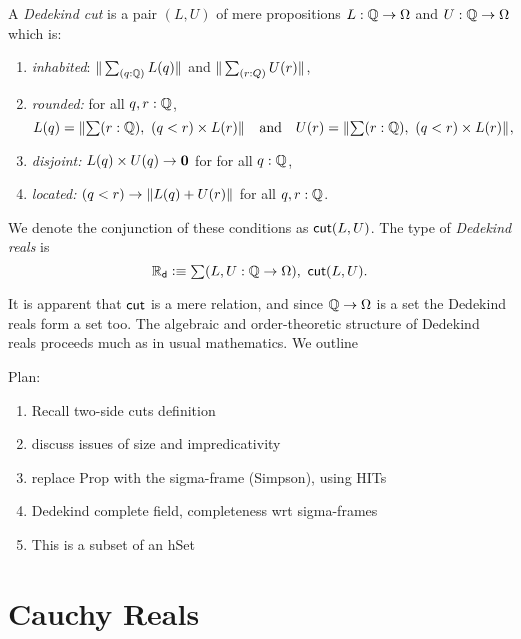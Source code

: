 \begin{defn}
  A \emph{Dedekind cut} is a pair $(L, U)$ of mere propositions $L : \mathbb{Q} \to \Omega$ and $U
  : \mathbb{Q} \to \Omega$ which is:
  \begin{enumerate}
  \item \emph{inhabited}: $\brck{\sm{q : \Q} L(q)}$ and $\brck{\sm{r : Q} U(r)}$,
  \item \emph{rounded:} for all $q, r : \mathbb{Q}$,
    \begin{equation*}
      L(q) = {\brck{\sm{r : \Q} (q < r) \times L(r)}}
      \quad\text{and}\quad
      U(r) = \brck{\sm{r : \Q} (q < r) \times L(r)},
    \end{equation*}
  \item \emph{disjoint:} $L(q) \times U(q) \to \mathbf{0}$ for for all $q : \mathbb{Q}$,
  \item \emph{located:} $(q < r) \to \Vert L(q) + U(r)\Vert_{}$ for all $q, r : \mathbb{Q}$.
  \end{enumerate}
  We denote the conjunction of these conditions as $\mathsf{cut}(L, U)$. The type of \emph{Dedekind
    reals} is
  \begin{equation*}
    \RD \defeq \sm{L, U : \Q \to \Omega} \dcut(L, U).
  \end{equation*}
\end{defn}

It is apparent that $\mathsf{cut}$ is a mere relation, and since $\mathbb{Q} \to \Omega$ is a set the
Dedekind reals form a set too. The algebraic and order-theoretic structure of Dedekind
reals proceeds much as in usual mathematics. We outline 


\hrulefill

Plan:
%
\begin{enumerate}
\item Recall two-side cuts definition
\item discuss issues of size and impredicativity
\item replace Prop with the sigma-frame (Simpson), using HITs
\item Dedekind complete field, completeness wrt sigma-frames
\item This is a subset of an hSet
\end{enumerate}




\section{Cauchy Reals}
\label{sec:cauchy-reals}

